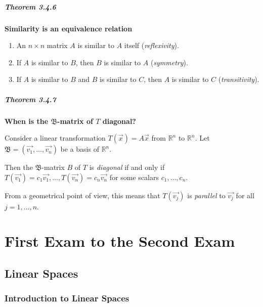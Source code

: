 \documentclass{report}
\begin{document}
\subsubsection*{Theorem 3.4.6}
\par\noindent\textbf{Similarity is an equivalence relation}
\renewcommand{\labelenumi}{\textbf{\alph{enumi}.}}
\begin{enumerate}
\item An $n\times{}n$ matrix $A$ is similar to $A$ itself (\textit{reflexivity}).
\item If $A$ is similar to $B$, then $B$ is similar to $A$ (\textit{symmetry}).
\item If $A$ is similar to $B$ and $B$ is similar to $C$, then $A$ is similar to $C$ (\textit{transitivity}).
\end{enumerate}
\subsubsection*{Theorem 3.4.7}
\par\noindent\textbf{When is the $\mathfrak{B}$-matrix of $T$ diagonal?}
\par\noindent Consider a linear transformation $T(\vec{x})=A\vec{x}$ from $\mathbb{R}^{n}$ to $\mathbb{R}^{n}$. Let $\mathfrak{B}=(\vec{v_{1}},\ldots{},\vec{v_{n}})$ be a basis of $\mathbb{R}^{n}$.
\par\noindent Then the $\mathfrak{B}$-matrix $B$ of $T$ is \textit{diagonal} if and only if $T(\vec{v_{1}})=c_{1}\vec{v_{1}},\ldots{},T(\vec{v_{n}})=c_{n}\vec{v_{n}}$ for some scalars $c_{1},\ldots{},c_{n}$.
\par\noindent From a geometrical point of view, this means that $T(\vec{v_{j}})$ is \textit{parallel} to $\vec{v_{j}}$ for all $j=1,\ldots{},n$.

\part{First Exam to the Second Exam}

\chapter{Linear Spaces}

\section{Introduction to Linear Spaces}
\end{document}
